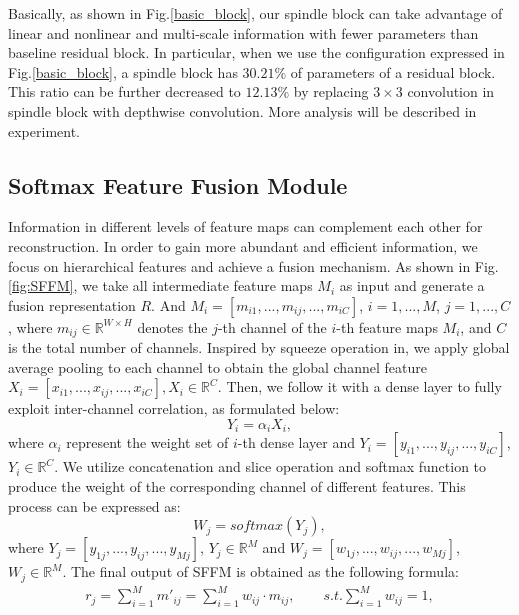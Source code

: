 \documentclass[journal]{IEEEtran}
\begin{document}
\par Basically, as shown in Fig.\ref{basic_block}, our spindle block can take advantage of linear and nonlinear and multi-scale information with fewer parameters than baseline residual block. In particular, when we use the configuration expressed in Fig.\ref{basic_block}, a spindle block has $30.21 \%$ of parameters of a residual block. This ratio can be further decreased to $12.13 \%$ by replacing $3\times 3$ convolution in spindle block with depthwise convolution. More analysis will be described in experiment.
\subsection{Softmax Feature Fusion Module}
Information in different levels of feature maps can complement each other for reconstruction. In order to gain more abundant and efficient information, we focus on hierarchical features and achieve a fusion mechanism. As shown in Fig.\ref{fig:SFFM}, we take all intermediate feature maps $M_{i}$ as input and generate a fusion representation $R$. And $M_{i}=\left [ m_{i1}, ..., m_{ij}, ...,m_{iC}  \right ]$, $i=1, ..., M$, $j=1, ..., C$, where $m_{ij}\in \mathbb{R}^{W\times H}$ denotes the $j$-th channel of the $i$-th feature maps $M_{i}$, and $C$ is the total number of channels. Inspired by squeeze operation in\cite{hu2017squeeze}, we apply global average pooling to each channel to obtain the global channel feature $X_{i}=\left [ x_{i1}, ..., x_{ij}, ..., x_{iC}  \right ], X_{i}\in  \mathbb{R}^{C}$. Then, we follow it with a dense layer to fully exploit inter-channel correlation, as formulated below:
\begin{equation}
Y_{i}=\alpha_{i}X_{i},
\label{dense_layer}
\end{equation}
where $\alpha_{i}$ represent the weight set of $i$-th dense layer and $Y_{i}=\left [ y_{i1}, ..., y_{ij}, ..., y_{iC} \right ]$, $Y_{i}\in \mathbb{R}^{C}$. We utilize concatenation and slice operation and softmax function to produce the weight of the corresponding channel of different features. This process can be expressed as:
\begin{equation}
W_{j}=softmax(Y_{j}),
\label{softmax_function}
\end{equation}
where $Y_{j}=\left [ y_{1j}, ..., y_{ij}, ..., y_{Mj}  \right ]$, $Y_{j}\in \mathbb{R}^{M}$ and  $W_{j}=\left [ w_{1j}, ..., w_{ij}, ..., w_{Mj}  \right ]$, $W_{j}\in \mathbb{R}^{M}$. The final output of SFFM is obtained as the following formula:
\begin{equation}
\begin{aligned}
r_{j}=\sum _{i=1}^{M}m{}'_{ij}=\sum _{i=1}^{M}w_{ij}\cdot m_{ij},\qquad s.t. \sum _{i=1}^{M}w_{ij}=1,
\end{aligned}
\label{weight_operation}
\end{equation}
\end{document}
